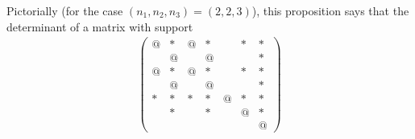 \documentclass{article}
\begin{document}
Pictorially (for the case $(n_1,n_2,n_3) = (2,2,3)$), this proposition says that the determinant of a matrix with support
\begin{align*}
\left(\begin{array}
	{cc|cc|ccc}
	@ & * & @ & * &  & * & *\\
	& @ & & @ & & & *\\\hline
	@ & * & @ & * &  & * & *\\
	& @ & & @ & & & *\\\hline
	* & * & * & * & @ & * & *\\
	& * & & * & & @ & *\\
	& & & & & & @
\end{array}\right)
\end{align*}
\end{document}
